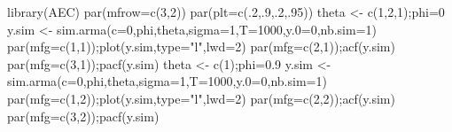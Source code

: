 \documentclass[
  12pt,
]{book}
\newenvironment{Shaded}{\begin{snugshade}}{\end{snugshade}}
\newcommand{\AttributeTok}[1]{\textcolor[rgb]{0.77,0.63,0.00}{#1}}
\newcommand{\DecValTok}[1]{\textcolor[rgb]{0.00,0.00,0.81}{#1}}
\newcommand{\FloatTok}[1]{\textcolor[rgb]{0.00,0.00,0.81}{#1}}
\newcommand{\FunctionTok}[1]{\textcolor[rgb]{0.00,0.00,0.00}{#1}}
\newcommand{\NormalTok}[1]{#1}
\newcommand{\OtherTok}[1]{\textcolor[rgb]{0.56,0.35,0.01}{#1}}
\newcommand{\StringTok}[1]{\textcolor[rgb]{0.31,0.60,0.02}{#1}}
\theoremstyle{definition}
\theoremstyle{definition}
\theoremstyle{definition}
\theoremstyle{definition}
\theoremstyle{remark}
\begin{document}
\begin{Shaded}
\begin{Highlighting}[]
\FunctionTok{library}\NormalTok{(AEC)}
\FunctionTok{par}\NormalTok{(}\AttributeTok{mfrow=}\FunctionTok{c}\NormalTok{(}\DecValTok{3}\NormalTok{,}\DecValTok{2}\NormalTok{))}
\FunctionTok{par}\NormalTok{(}\AttributeTok{plt=}\FunctionTok{c}\NormalTok{(.}\DecValTok{2}\NormalTok{,.}\DecValTok{9}\NormalTok{,.}\DecValTok{2}\NormalTok{,.}\DecValTok{95}\NormalTok{))}
\NormalTok{theta }\OtherTok{\textless{}{-}} \FunctionTok{c}\NormalTok{(}\DecValTok{1}\NormalTok{,}\DecValTok{2}\NormalTok{,}\DecValTok{1}\NormalTok{);phi}\OtherTok{=}\DecValTok{0}
\NormalTok{y.sim }\OtherTok{\textless{}{-}} \FunctionTok{sim.arma}\NormalTok{(}\AttributeTok{c=}\DecValTok{0}\NormalTok{,phi,theta,}\AttributeTok{sigma=}\DecValTok{1}\NormalTok{,}\AttributeTok{T=}\DecValTok{1000}\NormalTok{,}\AttributeTok{y.0=}\DecValTok{0}\NormalTok{,}\AttributeTok{nb.sim=}\DecValTok{1}\NormalTok{)}
\FunctionTok{par}\NormalTok{(}\AttributeTok{mfg=}\FunctionTok{c}\NormalTok{(}\DecValTok{1}\NormalTok{,}\DecValTok{1}\NormalTok{));}\FunctionTok{plot}\NormalTok{(y.sim,}\AttributeTok{type=}\StringTok{"l"}\NormalTok{,}\AttributeTok{lwd=}\DecValTok{2}\NormalTok{)}
\FunctionTok{par}\NormalTok{(}\AttributeTok{mfg=}\FunctionTok{c}\NormalTok{(}\DecValTok{2}\NormalTok{,}\DecValTok{1}\NormalTok{));}\FunctionTok{acf}\NormalTok{(y.sim)}
\FunctionTok{par}\NormalTok{(}\AttributeTok{mfg=}\FunctionTok{c}\NormalTok{(}\DecValTok{3}\NormalTok{,}\DecValTok{1}\NormalTok{));}\FunctionTok{pacf}\NormalTok{(y.sim)}
\NormalTok{theta }\OtherTok{\textless{}{-}} \FunctionTok{c}\NormalTok{(}\DecValTok{1}\NormalTok{);phi}\OtherTok{=}\FloatTok{0.9}
\NormalTok{y.sim }\OtherTok{\textless{}{-}} \FunctionTok{sim.arma}\NormalTok{(}\AttributeTok{c=}\DecValTok{0}\NormalTok{,phi,theta,}\AttributeTok{sigma=}\DecValTok{1}\NormalTok{,}\AttributeTok{T=}\DecValTok{1000}\NormalTok{,}\AttributeTok{y.0=}\DecValTok{0}\NormalTok{,}\AttributeTok{nb.sim=}\DecValTok{1}\NormalTok{)}
\FunctionTok{par}\NormalTok{(}\AttributeTok{mfg=}\FunctionTok{c}\NormalTok{(}\DecValTok{1}\NormalTok{,}\DecValTok{2}\NormalTok{));}\FunctionTok{plot}\NormalTok{(y.sim,}\AttributeTok{type=}\StringTok{"l"}\NormalTok{,}\AttributeTok{lwd=}\DecValTok{2}\NormalTok{)}
\FunctionTok{par}\NormalTok{(}\AttributeTok{mfg=}\FunctionTok{c}\NormalTok{(}\DecValTok{2}\NormalTok{,}\DecValTok{2}\NormalTok{));}\FunctionTok{acf}\NormalTok{(y.sim)}
\FunctionTok{par}\NormalTok{(}\AttributeTok{mfg=}\FunctionTok{c}\NormalTok{(}\DecValTok{3}\NormalTok{,}\DecValTok{2}\NormalTok{));}\FunctionTok{pacf}\NormalTok{(y.sim)}
\end{Highlighting}
\end{Shaded}
\end{document}

